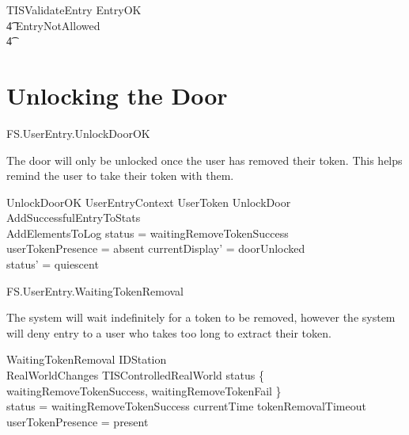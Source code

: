 \begin{zed}
        TISValidateEntry  EntryOK
\\ \t4          \lor EntryNotAllowed
\\ \t4          \lor [~ UserTokenTorn | status = waitingEntry ~] 
\end{zed}


\section{Unlocking the Door}

\begin{traceunit}{FS.UserEntry.UnlockDoorOK}
\end{traceunit}


The door will only be unlocked once the user has removed their token.
This helps remind the user to take their token with them.

\begin{schema}{UnlockDoorOK}
        UserEntryContext
\also
      \Xi UserToken
\also
        UnlockDoor
\\      AddSuccessfulEntryToStats
\\      AddElementsToLog
\where
        status = waitingRemoveTokenSuccess
\\      userTokenPresence = absent
\also
        currentDisplay' = doorUnlocked
\\      status' = quiescent
\end{schema}

\begin{traceunit}{FS.UserEntry.WaitingTokenRemoval}
\end{traceunit}

The system will wait indefinitely for a token to be removed, however
the system will deny entry to a user who takes too long to extract
their token.

\begin{schema}{WaitingTokenRemoval}
        \Xi IDStation
\\      RealWorldChanges
\also
        \Xi TISControlledRealWorld
\where
        status \in \{ waitingRemoveTokenSuccess, 
waitingRemoveTokenFail \}
\\      status = waitingRemoveTokenSuccess \implies currentTime \leq tokenRemovalTimeout 
\\      userTokenPresence = present
\end{schema}

